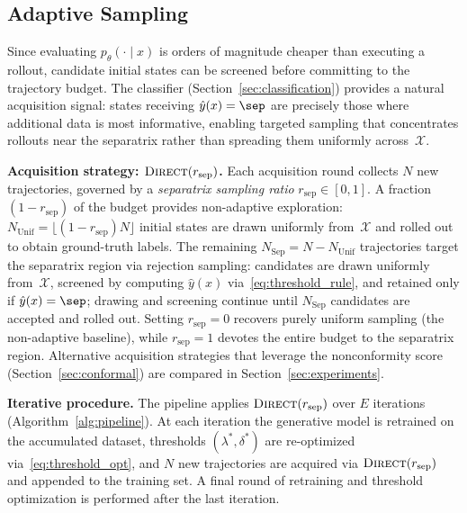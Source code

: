 \subsection{Adaptive Sampling}
\label{sec:adaptive}

Since evaluating $p_\theta(\cdot \mid x)$ is orders of magnitude cheaper
than executing a rollout, candidate initial states can be screened
before committing to the trajectory budget. The classifier
(Section~\ref{sec:classification}) provides a natural acquisition
signal: states receiving $\hat{y}(x) = \sep$ are precisely those where
additional data is most informative, enabling targeted sampling that
concentrates rollouts near the separatrix rather than spreading them
uniformly across~$\mathcal{X}$.

\textbf{Acquisition strategy: $\textsc{Direct}(r_{\mathrm{sep}})$.}
Each acquisition round collects $N$ new trajectories, governed by a
\emph{separatrix sampling ratio} $r_{\mathrm{sep}} \in [0,1]$.
A fraction $(1 - r_{\mathrm{sep}})$ of the budget provides non-adaptive
exploration: $N_{\mathrm{Unif}} = \lfloor (1 - r_{\mathrm{sep}}) N
\rfloor$ initial states are drawn uniformly from~$\mathcal{X}$ and
rolled out to obtain ground-truth labels. The remaining
$N_{\mathrm{Sep}} = N - N_{\mathrm{Unif}}$ trajectories target the
separatrix region via rejection sampling: candidates are drawn
uniformly from~$\mathcal{X}$, screened by computing $\hat{y}(x)$
via~\eqref{eq:threshold_rule}, and retained only if
$\hat{y}(x) = \sep$; drawing and screening continue until
$N_{\mathrm{Sep}}$ candidates are accepted and rolled out. Setting
$r_{\mathrm{sep}} = 0$ recovers purely uniform sampling (the
non-adaptive baseline), while $r_{\mathrm{sep}} = 1$ devotes the entire
budget to the separatrix region. Alternative acquisition strategies
that leverage the nonconformity score (Section~\ref{sec:conformal})
are compared in Section~\ref{sec:experiments}.

\textbf{Iterative procedure.}
The pipeline applies $\textsc{Direct}(r_{\mathrm{sep}})$ over $E$
iterations (Algorithm~\ref{alg:pipeline}). At each iteration the
generative model is retrained on the accumulated dataset, thresholds
$(\lambda^*, \delta^*)$ are re-optimized via~\eqref{eq:threshold_opt},
and $N$ new trajectories are acquired via
$\textsc{Direct}(r_{\mathrm{sep}})$ and appended to the training set.
A final round of retraining and threshold optimization is performed
after the last iteration.

